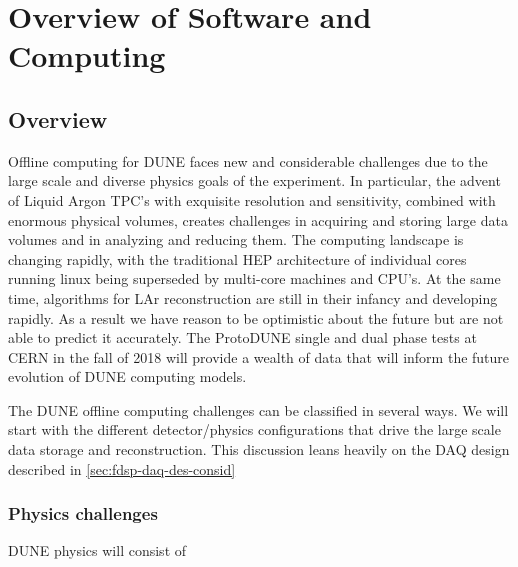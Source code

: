 %
\chapter{Overview of Software and Computing }

\section{Overview}

Offline computing for DUNE faces new and considerable challenges due to the large scale and diverse physics goals of the experiment.  In particular, the advent of Liquid Argon TPC's with exquisite resolution and sensitivity, combined with enormous physical volumes, creates challenges in acquiring and storing large data volumes and in analyzing and reducing them.  The computing landscape is changing rapidly, with the traditional HEP architecture of individual cores running linux being superseded by multi-core machines and CPU's. At the same time, algorithms for LAr reconstruction are still in their infancy and developing rapidly.  As a result we have reason to be optimistic about the future but are not able to predict it accurately.  The ProtoDUNE single and dual phase tests at CERN in the fall of 2018 will provide a wealth of data that will inform the future evolution of DUNE computing models.

The DUNE offline computing challenges can be classified in several ways.  We will start with the different detector/physics configurations that drive the large scale data storage and reconstruction. 
This discussion leans heavily on the DAQ design described in \ref{sec:fdsp-daq-des-consid}


\subsection{Physics challenges}

DUNE physics will consist of 


